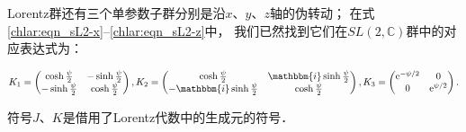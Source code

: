 Lorentz群还有三个单参数子群分别是沿$x$、$y$、$z$轴的伪转动；
在式\eqref{chlar:eqn_sL2-x}--\eqref{chlar:eqn_sL2-z}中，
我们已然找到它们在$SL(2,\mathbb{C})$群中的对应表达式为：
\begin{small}
\begin{align*}
    K_1=\begin{pmatrix}
        \cosh \frac{\psi}{2} & -\sinh \frac{\psi}{2} \\
        -\sinh \frac{\psi}{2} & \cosh \frac{\psi}{2}
    \end{pmatrix}, 
    K_2=\begin{pmatrix}
        \cosh \frac{\psi}{2} & \mathbbm{i} \sinh \frac{\psi}{2} \\
        -\mathbbm{i} \sinh \frac{\psi}{2} & \cosh \frac{\psi}{2}
    \end{pmatrix},
    K_3=\begin{pmatrix}
        \mathrm{e}^{-\psi / 2} & 0 \\
        0 & \mathrm{e}^{\psi / 2}
\end{pmatrix} .
\end{align*}  %
\end{small}
符号$J$、$K$是借用了Lorentz代数中的生成元的符号．

